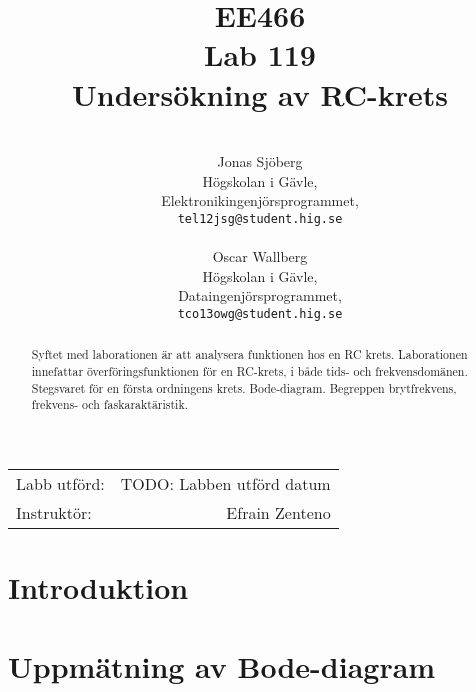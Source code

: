 \documentclass[11pt,a4paper]{article}
\title{EE466 \\ Lab 119 \\ Undersökning av RC-krets}
\author{\\
  Jonas Sjöberg\\
  Högskolan i Gävle,\\
  Elektronikingenjörsprogrammet,\\
  \texttt{tel12jsg@student.hig.se}\\
  \\
  Oscar Wallberg\\
  Högskolan i Gävle,\\
  Dataingenjörsprogrammet,\\
  \texttt{tco13owg@student.hig.se}\\}
\date{}
\begin{document}
\maketitle

\begin{center}
    \begin{tabular}{l r}
        Labb utförd: & TODO: Labben utförd datum \\
        Instruktör: & Efrain Zenteno
    \end{tabular}
\end{center}

\begin{abstract}
    Syftet med laborationen är att analysera funktionen hos en RC krets.
    Laborationen innefattar överföringsfunktionen för en RC-krets, i både tids-
    och frekvensdomänen. Stegsvaret för en första ordningens krets. Bode-diagram.
    Begreppen brytfrekvens, frekvens- och faskaraktäristik.
\end{abstract}

\newpage

{
    \setcounter{tocdepth}{3}
    \tableofcontents
}

\newpage

\section{Introduktion}\label{setup}


\section{Uppmätning av Bode-diagram}\label{}
\end{document}
